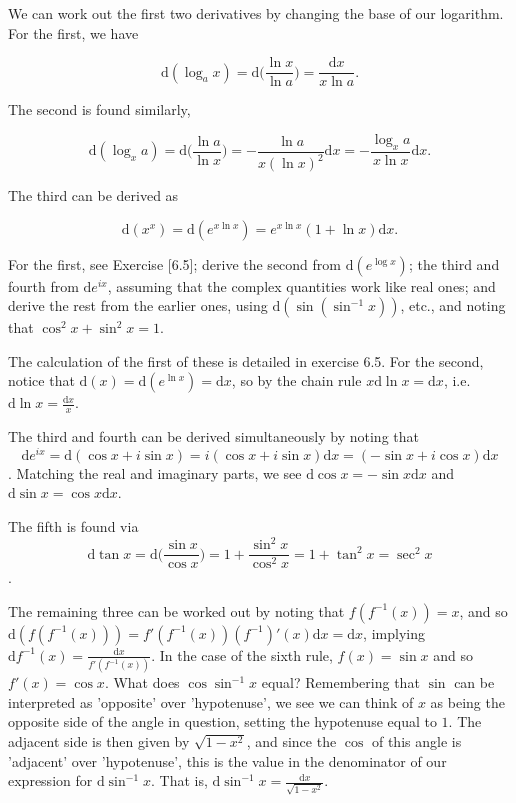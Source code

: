 \documentclass[../the-road-to-reality.tex]{subfiles}
\begin{document}
\begin{questions}
\begin{solution}
	We can work out the first two derivatives by changing the base of our logarithm. For the first, we have
	
	\[
		\mathrm{d}(\log_ax) = \mathrm{d}\Big(\frac{\ln{x}}{\ln{a}}\Big)=\frac{\mathrm{d}x}{x\ln{a}}
	.\] 	

	The second is found similarly,
	
\[
	\mathrm{d}(\log_xa) = \mathrm{d}\Big(\frac{\ln{a}}{\ln{x}}\Big) = {-\frac{\ln{a}}{x(\ln{x})^2}}\mathrm{d}x = {-\frac{\log_xa}{x\ln{x}}}\mathrm{d}x
.\] 	

	The third can be derived as

	\[
	\mathrm{d}(x^x) = \mathrm{d}(e^{x\ln{x}}) = e^{x\ln{x}}(1 + \ln{x})\mathrm{d}x
	.\] 
\end{solution}

\question For the first, see Exercise [6.5]; derive the second from $\mathrm{d}(e^{\log{x}})$; the third and fourth from $\mathrm{d}e^{ix}$, assuming that the complex quantities work like real ones; and derive the rest from the earlier ones, using $\mathrm{d}(\sin(\sin^{-1}x))$, etc., and noting that $\cos^2x + \sin^2x = 1$.

\begin{solution}
	The calculation of the first of these is detailed in exercise 6.5. For the second, notice that $\mathrm{d}(x) = \mathrm{d}(e^{\ln{x}}) = \mathrm{d}x$, so by the chain rule $x\mathrm{d}\ln{x} = \mathrm{d}x$, i.e. $\mathrm{d}\ln{x} = \frac{\mathrm{d}x}{x}$. 

	The third and fourth can be derived simultaneously by noting that $$\mathrm{d}e^{ix} = \mathrm{d}(\cos{x} + i\sin{x}) = i(\cos{x} + i\sin{x})\mathrm{d}x = (-\sin{x} + i\cos{x})\mathrm{d}x$$. Matching the real and imaginary parts, we see $\mathrm{d}\cos{x} = -\sin{x}\mathrm{d}x$ and $\mathrm{d}\sin{x} = \cos{x}\mathrm{d}x$.

	The fifth is found via $$\mathrm{d}\tan{x} = \mathrm{d}\Big(\frac{\sin{x}}{\cos{x}}\Big) = 1 + \frac{\sin^2{x}}{\cos^2{x}} = 1 + \tan^2{x} = \sec^2{x}$$.

	The remaining three can be worked out by noting that $f(f^{-1}(x)) = x$, and so $\mathrm{d}(f(f^{-1}(x))) = f'(f^{-1}(x))(f^{-1})'(x)\mathrm{d}x = \mathrm{d}x$, implying $\mathrm{d}f^{-1}(x) = \frac{\mathrm{d}x}{f'(f^{-1}(x))}$. In the case of the sixth rule, $f(x) = \sin{x}$ and so $f'(x) = \cos{x}$. What does $\cos{\sin^{-1}{x}}$ equal? Remembering that $\sin$ can be interpreted as 'opposite' over 'hypotenuse', we see we can think of $x$ as being the opposite side of the angle in question, setting the hypotenuse equal to $1$. The adjacent side is then given by $\sqrt{1 - x^2}$, and since the $\cos$ of this angle is 'adjacent' over 'hypotenuse', this is the value in the denominator of our expression for $\mathrm{d}\sin^{-1}{x}$. That is, $\mathrm{d}\sin^{-1}{x} = \frac{\mathrm{d}x}{\sqrt{1 - x^2}}$.


\end{solution}
\end{questions}
\end{document}
